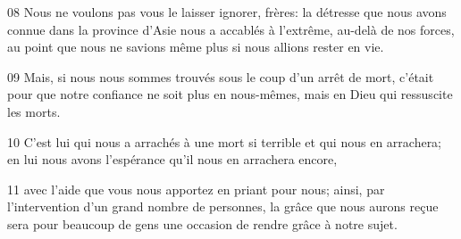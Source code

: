 
08 Nous ne voulons pas vous le laisser ignorer, frères: la détresse que nous avons connue dans la province d’Asie nous a accablés à l’extrême, au-delà de nos forces, au point que nous ne savions même plus si nous allions rester en vie.

09 Mais, si nous nous sommes trouvés sous le coup d’un arrêt de mort, c’était pour que notre confiance ne soit plus en nous-mêmes, mais en Dieu qui ressuscite les morts.

10 C’est lui qui nous a arrachés à une mort si terrible et qui nous en arrachera; en lui nous avons l’espérance qu’il nous en arrachera encore,

11 avec l’aide que vous nous apportez en priant pour nous; ainsi, par l’intervention d’un grand nombre de personnes, la grâce que nous aurons reçue sera pour beaucoup de gens une occasion de rendre grâce à notre sujet.